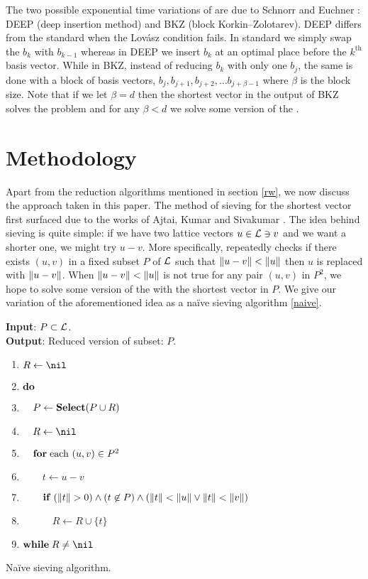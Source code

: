 \documentclass{homework}
\begin{document}
The two possible exponential time variations of \LLL{} are due to
Schnorr \cite{schnorr1987hierarchy} and Euchner
\cite{schnorr1994lattice}: DEEP (deep insertion method) and BKZ (block
Korkin--Zolotarev). DEEP differs from the standard \LLL{} when the
Lov\'asz condition fails. In standard \LLL{} we simply swap the $b_k$
with $b_{k-1}$ whereas in DEEP we insert $b_k$ at an optimal place
before the $k^\text{th}$ basis vector. While in BKZ, instead of
reducing $b_k$ with only one $b_{j}$, the same is done with a block of
basis vectors, $b_j, b_{j+1}, b_{j+2}, \dots b_{j+\beta - 1}$ where
$\beta$ is the block size. Note that if we let $\beta=d$ then the
shortest vector in the output of BKZ solves the \SVP{} problem and for
any $\beta < d$ we solve some version of the \appr\SVP{}.

\section{Methodology}

Apart from the reduction algorithms mentioned in section \ref{rw}, we
now discuss the approach taken in this paper. The method of sieving
for the shortest vector first surfaced due to the works of Ajtai,
Kumar and Sivakumar \cite{ajtai2001sieve}. The idea behind sieving is
quite simple: if we have two lattice vectors $u \in \mathcal{L} \ni v$ and we
want a shorter one, we might try $u - v$. More specifically,
repeatedly checks if there exists $(u, v)$ in a fixed subset $P$ of
$\mathcal{L}$ such that $\left\lVert u - v\right\rVert < \left\lVert u\right\rVert$ then $u$ is replaced with
$\left\lVert u - v\right\rVert$. When $\left\lVert u - v\right\rVert < \left\lVert u\right\rVert$ is not true for any
pair $(u, v)$ in $P^2$, we hope to solve some version of the
\appr\SVP{} with the shortest vector in $P$. We give our variation of
the aforementioned idea as a na\"ive sieving algorithm \ref{naive}.

\begin{algorithm}
\begin{flushleft}
    \noindent\textbf{Input}: $P \subset \mathcal{L}$. \\
    \noindent\textbf{Output}: Reduced version of subset: $P.$
  \end{flushleft}
  \begin{enumerate}[label=\arabic*:]
    \item $R \leftarrow \nil$
    \item $\mathbf{do\;}$
    \item $\quad P \leftarrow \mathbf{Select}(P \cup R)$
    \item $\quad R \leftarrow \nil$
    \item $\quad \mathbf{for\;} \text{each } (u, v) \in P^2$
    \item $\quad\quad t \leftarrow u - v$
    \item $\quad\quad \mathbf{if\;} (\left\lVert t\right\rVert > 0) \wedge
    (t \not\in P) \wedge
    (\left\lVert t\right\rVert < \left\lVert u\right\rVert \vee \left\lVert t\right\rVert < \left\lVert v\right\rVert)$
    \item $\quad\quad\quad R \leftarrow R \cup \{t\}$
    \item $\WHILE R \neq \nil$
  \end{enumerate}
  \caption{Na\"ive sieving algorithm.}
  \label{naive}
\end{algorithm}
\end{document}
